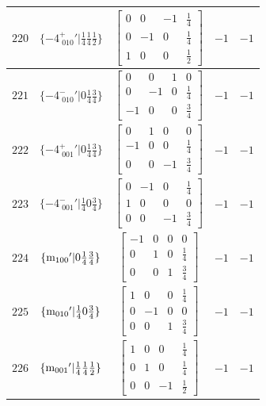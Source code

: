 \documentclass[fleqn,8pt]{jsarticle}
\begin{document}
\begin{longtable}{ccccc}
$ 220 $ & $ \{-4^{+}_{\,\,010}{}'|\frac{1}{4} \frac{1}{4} \frac{1}{2}\} $ & $ \begin{bmatrix} 0 & 0 & -1 & \frac{1}{4} \\ 0 & -1 & 0 & \frac{1}{4} \\ 1 & 0 & 0 & \frac{1}{2} \end{bmatrix} $ & $ -1 $ & $ -1 $ \\ \hline
$ 221 $ & $ \{-4^{-}_{\,\,010}{}'|0 \frac{1}{4} \frac{3}{4}\} $ & $ \begin{bmatrix} 0 & 0 & 1 & 0 \\ 0 & -1 & 0 & \frac{1}{4} \\ -1 & 0 & 0 & \frac{3}{4} \end{bmatrix} $ & $ -1 $ & $ -1 $ \\ \hline
$ 222 $ & $ \{-4^{+}_{\,\,001}{}'|0 \frac{1}{4} \frac{3}{4}\} $ & $ \begin{bmatrix} 0 & 1 & 0 & 0 \\ -1 & 0 & 0 & \frac{1}{4} \\ 0 & 0 & -1 & \frac{3}{4} \end{bmatrix} $ & $ -1 $ & $ -1 $ \\ \hline
$ 223 $ & $ \{-4^{-}_{\,\,001}{}'|\frac{1}{4} 0 \frac{3}{4}\} $ & $ \begin{bmatrix} 0 & -1 & 0 & \frac{1}{4} \\ 1 & 0 & 0 & 0 \\ 0 & 0 & -1 & \frac{3}{4} \end{bmatrix} $ & $ -1 $ & $ -1 $ \\ \hline
$ 224 $ & $ \{{\rm m}_{100}{}'|0 \frac{1}{4} \frac{3}{4}\} $ & $ \begin{bmatrix} -1 & 0 & 0 & 0 \\ 0 & 1 & 0 & \frac{1}{4} \\ 0 & 0 & 1 & \frac{3}{4} \end{bmatrix} $ & $ -1 $ & $ -1 $ \\ \hline
$ 225 $ & $ \{{\rm m}_{010}{}'|\frac{1}{4} 0 \frac{3}{4}\} $ & $ \begin{bmatrix} 1 & 0 & 0 & \frac{1}{4} \\ 0 & -1 & 0 & 0 \\ 0 & 0 & 1 & \frac{3}{4} \end{bmatrix} $ & $ -1 $ & $ -1 $ \\ \hline
$ 226 $ & $ \{{\rm m}_{001}{}'|\frac{1}{4} \frac{1}{4} \frac{1}{2}\} $ & $ \begin{bmatrix} 1 & 0 & 0 & \frac{1}{4} \\ 0 & 1 & 0 & \frac{1}{4} \\ 0 & 0 & -1 & \frac{1}{2} \end{bmatrix} $ & $ -1 $ & $ -1 $ \\ \hline

\end{longtable}
\end{document}
